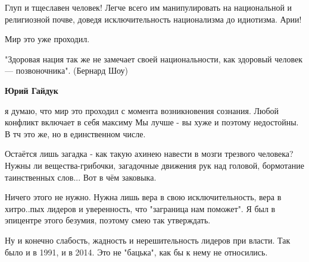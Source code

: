 \begin{itemize}
 

Глуп и тщеславен человек! Легче всего им манипулировать на национальной и
религиозной почве, доведя исключительность национализма до идиотизма. Арии!

Мир это уже проходил.

"Здоровая нация так же не замечает своей национальности, как здоровый человек —
позвоночника". (Бернард Шоу)

\begin{itemize}
 
\textbf{Юрий Гайдук} 

я думаю, что мир это проходил с момента возникновения сознания. Любой конфликт
включает в себя максиму Мы лучше - вы хуже и поэтому недостойны. В тч это же,
но в единственном числе.

Остаётся лишь загадка - как такую ахинею навести в мозги трезвого человека?
Нужны ли вещества-грибочки, загадочные движения рук над головой, бормотание
таинственных слов... Вот в чём заковыка.


 

Ничего этого не нужно. Нужна лишь вера в свою исключительность, вера в
хитро..пых лидеров и уверенность, что "заграница нам поможет". Я был в
эпицентре этого безумия, поэтому смею так утверждать.

Ну и конечно слабость, жадность и нерешительность лидеров при власти. Так было
и в 1991, и в 2014. Это не "бацька", как бы к нему не относились.

\end{itemize}

 

\end{itemize}
